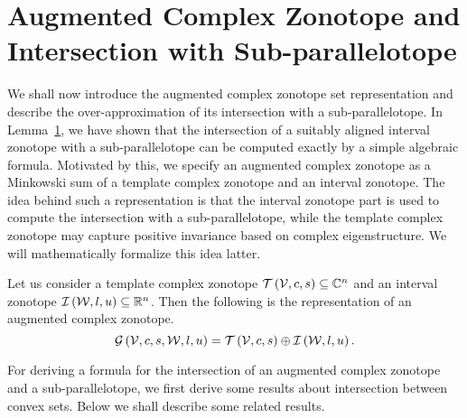 \section{Augmented Complex Zonotope and Intersection with Sub-parallelotope}
We shall now introduce the augmented complex zonotope set
representation and describe the over-approximation of its intersection
with a sub-parallelotope.  In Lemma~\ref{}, we have shown that the
intersection of a suitably aligned interval zonotope with a
sub-parallelotope can be computed exactly by a simple algebraic
formula.  Motivated by this, we specify an augmented complex zonotope
as a Minkowski sum of a template complex zonotope and an interval
zonotope.  The idea behind such a representation is that the interval
zonotope part is used to compute the intersection with a
sub-parallelotope, while the template complex zonotope may capture
positive invariance based on complex eigenstructure.  We will
mathematically formalize this idea latter.
%
\begin{definition}
Let us consider a template complex zonotope
$\mathit{\operatorname{\mathcal{T}}}\left(\mathcal{V},c,s\right)\subseteq\mathbb{C}^n$ and an interval
zonotope $\mathit{\operatorname{\mathcal{I}}}\left(\mathcal{W},l,u\right)\subseteq\mathbb{R}^n$.  Then the
following is the representation of an augmented complex zonotope.
%
\[
\mathcal{G}\left(\mathcal{V},c,s,\mathcal{W},l,u\right)=\mathit{\operatorname{\mathcal{T}}}\left(\mathcal{V},c,s\right)\oplus \mathit{\operatorname{\mathcal{I}}}\left(\mathcal{W},l,u\right).
\]
%
\end{definition}
%
For deriving a formula for the intersection of an augmented complex
zonotope and a sub-parallelotope, we first derive some results about
intersection between convex sets.  Below we shall describe some
related results.

